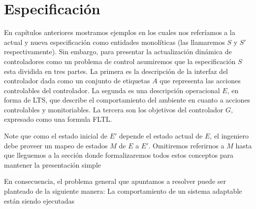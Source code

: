 \section{Especificación}

En capítulos anteriores mostramos ejemplos en los cuales nos referíamos a la actual y nueva especificación como
entidades monolíticas (las llamaremos $S$ y $S'$ respectivamente). Sin embargo, para presentar la actualización dinámica
de controladores como un problema de control asumiremos que la especificación $S$ esta dividida en tres partes. La
primera es la descripción de la interfaz del controlador dada como un conjunto de etiquetas $A$ que representa las
acciones controlables del controlador. La segunda es una descripción operacional $E$, en forma de LTS, que describe el
comportamiento del ambiente en cuanto a acciones controlables y monitoriables. La tercera son los objetivos del
controlador $G$, expresado como una formula FLTL.

Note que como el estado inicial de $E'$ depende el estado actual de $E$, el ingeniero debe proveer un mapeo de estados
$M$ de $E$ a $E'$. Omitiremos referirnos a $M$ hasta que lleguemos a la sección donde formalizaremos todos estos
conceptos para mantener la presentación simple

En consecuencia, el problema general que apuntamos a resolver puede ser planteado de la siguiente manera: La
comportamiento de un sistema adaptable están siendo ejecutadas

